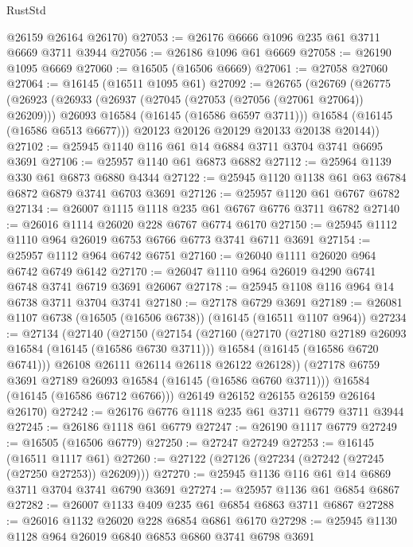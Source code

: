 \begin{lexlean}{RustStd}
\begin{coremodule}
      @26159
      @26164
      @26170)
@27053 := @26176 @6666 @1096 @235 @61 @3711 @6669 @3711 @3944
@27056 := @26186 @1096 @61 @6669
@27058 := @26190 @1095 @6669
@27060 := @16505 (@16506 @6669)
@27061 := @27058 @27060
@27064 := @16145 (@16511 @1095 @61)
@27092 := @26765
    (@26769
      (@26775
        (@26923
          (@26933
            (@26937 (@27045 (@27053 (@27056 (@27061 @27064)) @26209)))
            @26093
            @16584
            (@16145 (@16586 @6597 @3711)))
          @16584
          (@16145 (@16586 @6513 @6677)))
        @20123
        @20126
        @20129
        @20133
        @20138
        @20144))
@27102 := @25945 @1140 @116 @61 @14 @6884 @3711 @3704 @3741 @6695 @3691
@27106 := @25957 @1140 @61 @6873 @6882
@27112 := @25964 @1139 @330 @61 @6873 @6880 @4344
@27122 := @25945 @1120 @1138 @61 @63 @6784 @6872 @6879 @3741 @6703 @3691
@27126 := @25957 @1120 @61 @6767 @6782
@27134 := @26007 @1115 @1118 @235 @61 @6767 @6776 @3711 @6782
@27140 := @26016 @1114 @26020 @228 @6767 @6774 @6170
@27150 := @25945 @1112 @1110 @964 @26019 @6753 @6766 @6773 @3741 @6711 @3691
@27154 := @25957 @1112 @964 @6742 @6751
@27160 := @26040 @1111 @26020 @964 @6742 @6749 @6142
@27170 := @26047 @1110 @964 @26019 @4290 @6741 @6748 @3741 @6719 @3691 @26067
@27178 := @25945 @1108 @116 @964 @14 @6738 @3711 @3704 @3741
@27180 := @27178 @6729 @3691
@27189 := @26081 @1107 @6738 (@16505 (@16506 @6738)) (@16145 (@16511 @1107 @964))
@27234 := @27134
    (@27140
      (@27150
        (@27154
          (@27160
            (@27170
              (@27180 @27189 @26093 @16584 (@16145 (@16586 @6730 @3711)))
              @16584
              (@16145 (@16586 @6720 @6741)))
            @26108
            @26111
            @26114
            @26118
            @26122
            @26128))
        (@27178 @6759 @3691 @27189 @26093 @16584 (@16145 (@16586 @6760 @3711)))
        @16584
        (@16145 (@16586 @6712 @6766)))
      @26149
      @26152
      @26155
      @26159
      @26164
      @26170)
@27242 := @26176 @6776 @1118 @235 @61 @3711 @6779 @3711 @3944
@27245 := @26186 @1118 @61 @6779
@27247 := @26190 @1117 @6779
@27249 := @16505 (@16506 @6779)
@27250 := @27247 @27249
@27253 := @16145 (@16511 @1117 @61)
@27260 := @27122 (@27126 (@27234 (@27242 (@27245 (@27250 @27253)) @26209)))
@27270 := @25945 @1136 @116 @61 @14 @6869 @3711 @3704 @3741 @6790 @3691
@27274 := @25957 @1136 @61 @6854 @6867
@27282 := @26007 @1133 @409 @235 @61 @6854 @6863 @3711 @6867
@27288 := @26016 @1132 @26020 @228 @6854 @6861 @6170
@27298 := @25945 @1130 @1128 @964 @26019 @6840 @6853 @6860 @3741 @6798 @3691

\end{coremodule}
\end{lexlean}
